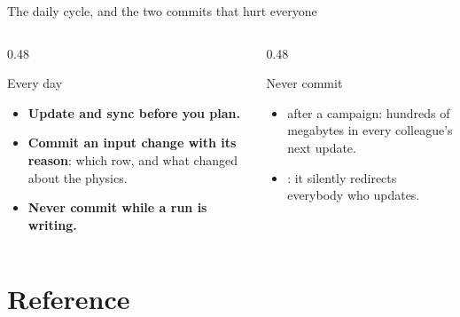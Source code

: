 \begin{frame}{The daily cycle, and the two commits that hurt everyone}
\begin{columns}[T]
\begin{column}{0.48\textwidth}
\begin{block}{Every day}
\begin{itemize}\small
  \item \textbf{Update and sync before you plan.}
  \item \textbf{Commit an input change with its reason}: which row, and what
        changed about the physics.
  \item \textbf{Never commit while a run is writing.}
\end{itemize}
\end{block}
\end{column}
\begin{column}{0.48\textwidth}
\begin{alertblock}{Never commit}
\begin{itemize}\small
  \item {} after a campaign: hundreds of megabytes in every
        colleague's next update.
  \item {}: it silently redirects everybody who
        updates.
\end{itemize}
\end{alertblock}
\end{column}
\end{columns}
\end{frame}

\section{Reference}

